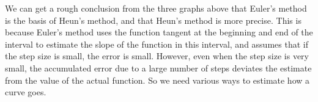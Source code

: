 \documentclass[12pt]{article}
\begin{document}
We can get a rough conclusion from the three graphs above that Euler's method is the basis of Heun's method, and that Heun's method is more precise. This is because Euler's method uses the function tangent at the beginning and end of the interval to estimate the slope of the function in this interval, and assumes that if the step size is small, the error is small. However, even when the step size is very small, the accumulated error due to a large number of steps deviates the estimate from the value of the actual function. So we need various ways to estimate how a curve goes. 



\begin{thebibliography}{9}


\end{thebibliography}

\end{document}
